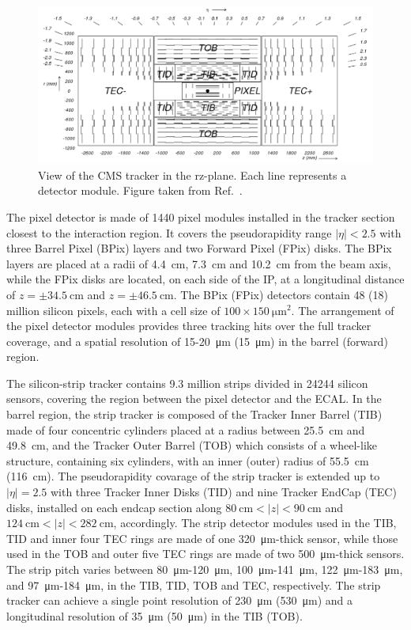 \begin{figure}[!htbp]
 \begin{center}
  \includegraphics[width=1.0\textwidth]{Figures/Experiment/CMS/Tracker.png}
 \end{center}
 \caption{View of the CMS tracker in the rz-plane. Each line represents a detector module. Figure taken from Ref.~\cite{CMS}.}
 \label{fig:CMS_Tracker}
\end{figure}

The pixel detector is made of 1440 pixel modules installed in the tracker section closest to the interaction region. It covers the pseudorapidity range $|\eta|<2.5$ with three Barrel Pixel (BPix) layers and two Forward Pixel (FPix) disks. The BPix layers are placed at a radii of \SI{4.4}{\cm}, \SI{7.3}{\cm} and \SI{10.2}{\cm} from the beam axis, while the FPix disks are located, on each side of the IP, at a longitudinal distance of $z={\pm}\SI{34.5}{\cm}$ and $z={\pm}\SI{46.5}{\cm}$. The BPix (FPix) detectors contain 48 (18) million silicon pixels, each with a cell size of $100{\times}\SI{150}{\um\squared}$. The arrangement of the pixel detector modules provides three tracking hits over the full tracker coverage, and a spatial resolution of 15-\SI{20}{\um} (\SI{15}{\um}) in the barrel (forward) region.

The silicon-strip tracker contains 9.3 million strips divided in 24244 silicon sensors, covering the region between the pixel detector and the ECAL. In the barrel region, the strip tracker is composed of the Tracker Inner Barrel (TIB) made of four concentric cylinders placed at a radius between \SI{25.5}{\cm} and \SI{49.8}{\cm}, and the Tracker Outer Barrel (TOB) which consists of a wheel-like structure,  containing six cylinders, with an inner (outer) radius of \SI{55.5}{\cm} (\SI{116}{\cm}). The pseudorapidity covarage of the strip tracker is extended up to $|\eta|=2.5$ with three Tracker Inner Disks (TID) and nine Tracker EndCap (TEC) disks, installed on each endcap section along $\SI{80}{\cm} < |z| < \SI{90}{\cm}$ and $\SI{124}{\cm} < |z| < \SI{282}{\cm}$, accordingly. The strip detector modules used in the TIB, TID and inner four TEC rings are made of one \SI{320}{\um}-thick sensor, while those used in the TOB and outer five TEC rings are made of two \SI{500}{\um}-thick sensors. The strip pitch varies between \SI{80}{\um}-\SI{120}{\um}, \SI{100}{\um}-\SI{141}{\um}, \SI{122}{\um}-\SI{183}{\um}, and \SI{97}{\um}-\SI{184}{\um}, in the TIB, TID, TOB and TEC, respectively. The strip tracker can achieve a single point resolution of \SI{230}{\um} (\SI{530}{\um}) and a longitudinal resolution of \SI{35}{\um} (\SI{50}{\um}) in the TIB (TOB).


